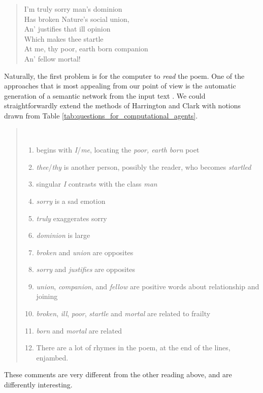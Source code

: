 {\itshape
\begin{verse}
I'm truly sorry man's dominion\\
Has broken Nature's social union,\\
An' justifies that ill opinion\\
Which makes thee startle\\
At me, thy poor, earth born companion\\
An' fellow mortal!\\
\end{verse}
}

Naturally, the first problem is for the computer to \emph{read} the
poem.  One of
the approaches that is most appealing from our point of view is the
automatic generation of a semantic network from the input text
\cite{harrington2007asknet}.  We could straightforwardly extend the methods of Harrington
and Clark with notions drawn from Table
\ref{tab:questions_for_computational_agents}.

\begin{quotation}
~\vspace{-1\baselineskip}
\begin{enumerate}
\item begins with \emph{I}/\emph{me}, locating the \emph{poor, earth born} poet
\item \emph{thee}/\emph{thy} is another person, possibly the reader, who becomes \emph{startled}
\item singular \emph{I} contrasts with the class \emph{man}
\item \emph{sorry} is a sad emotion
\item \emph{truly} exaggerates sorry
\item \emph{dominion} is large
\item \emph{broken} and \emph{union} are opposites
\item \emph{sorry} and \emph{justifies} are opposites
\item \emph{union}, \emph{companion}, and \emph{fellow} are positive words about relationship and joining
\item \emph{broken}, \emph{ill}, \emph{poor}, \emph{startle} and \emph{mortal} are related to frailty
\item \emph{born} and \emph{mortal} are related
\item There are a lot of rhymes in the poem, at the end of the lines, enjambed.
\end{enumerate}
\end{quotation}
These comments are very different from the other reading above, and are differently interesting.

